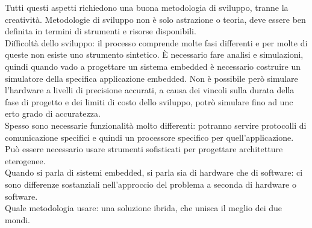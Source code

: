 \documentclass[12pt, oneside]{extbook}
\begin{document}
Tutti questi aspetti richiedono una buona metodologia di sviluppo, tranne la creatività. Metodologie di sviluppo non è solo astrazione o teoria, deve essere ben definita in termini di strumenti e risorse disponibili.\\ Difficoltà dello sviluppo: il processo comprende molte fasi differenti e per molte di queste non esiste uno strumento sintetico. È necessario fare analisi e simulazioni, quindi quando vado a progettare un sistema embedded è necessario costruire un simulatore della specifica applicazione embedded. Non è possibile però simulare l'hardware a livelli di precisione accurati, a causa dei vincoli sulla durata della fase di progetto e dei limiti di costo dello sviluppo, potrò simulare fino ad unc erto grado di accuratezza.\\ Spesso sono necessarie funzionalità molto differenti: potranno servire protocolli di comunicazione specifici e quindi un processore specifico per quell'applicazione. Può essere necessario usare strumenti sofisticati per progettare architetture eterogenee.\\ Quando si parla di sistemi embedded, si parla sia di hardware che di software: ci sono differenze sostanziali nell'approccio del problema a seconda di hardware o software.\\ Quale metodologia usare: una soluzione ibrida, che unisca il meglio dei due mondi.
\end{document}

